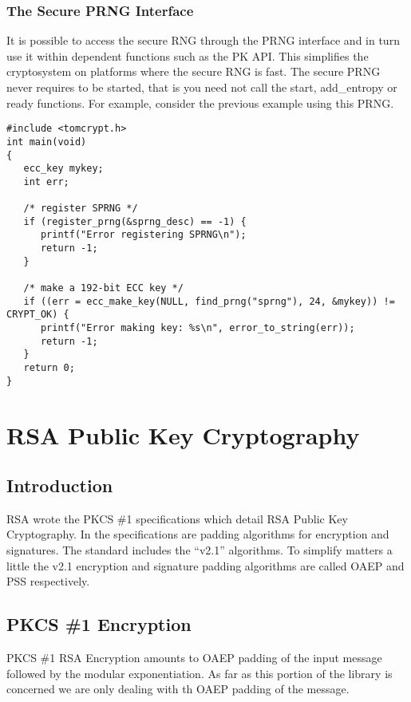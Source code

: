 \documentclass[a4paper]{book}
\begin{document}
\subsection{The Secure PRNG Interface}
It is possible to access the secure RNG through the PRNG interface and in turn use it within dependent functions such
as the PK API.  This simplifies the cryptosystem on platforms where the secure RNG is fast.  The secure PRNG never 
requires to be started, that is you need not call the start, add\_entropy or ready functions.  For example, consider
the previous example using this PRNG.

\begin{small}
\begin{verbatim}
#include <tomcrypt.h>
int main(void)
{
   ecc_key mykey;
   int err;

   /* register SPRNG */
   if (register_prng(&sprng_desc) == -1) {
      printf("Error registering SPRNG\n");
      return -1;
   }

   /* make a 192-bit ECC key */
   if ((err = ecc_make_key(NULL, find_prng("sprng"), 24, &mykey)) != CRYPT_OK) {
      printf("Error making key: %s\n", error_to_string(err));
      return -1;
   }
   return 0;
}
\end{verbatim}
\end{small}



\chapter{RSA Public Key Cryptography}

\section{Introduction}
RSA wrote the PKCS \#1 specifications which detail RSA Public Key Cryptography.  In the specifications are
padding algorithms for encryption and signatures.  The standard includes the ``v2.1'' algorithms.
To simplify matters a little the v2.1 encryption and signature padding algorithms are called OAEP and PSS 
respectively.  

\section{PKCS \#1 Encryption}

PKCS \#1 RSA Encryption amounts to OAEP padding of the input message followed by the modular exponentiation.  As far as this portion of
the library is concerned we are only dealing with th OAEP padding of the message.
\end{document}
